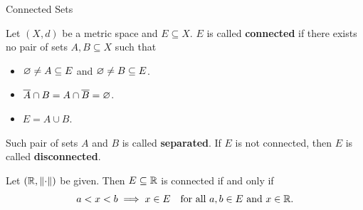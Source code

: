 \begin{section}{Connected Sets}

Let $(X, d)$ be a metric space and $E \subseteq X$. $E$ is called \textbf{connected}
if there exists no pair of sets $A, B \subseteq X$ such that
\begin{itemize}
    \item $\vnot \neq A \subseteq E$ and $\vnot \neq B \subseteq E$.
    \item $\overline{A} \cap B = A \cap \overline{B} = \vnot$.
    \item $E = A \cup B$.
\end{itemize}
Such pair of sets $A$ and $B$ is called \textbf{separated}.
If $E$ is not connected, then $E$ is called \textbf{disconnected}.

\bigskip

\begin{theorem} \label{thm:ConnectedSetsInR}
    Let $(\R, \norm*{\cdot})$ be given. Then $E \subseteq \R$ is connected if and only if
    \[
    a < x < b \implies x \in E \quad \text{for all } a, b \in E \text{ and } x \in \R.
    \]
\end{theorem}


\end{section}

